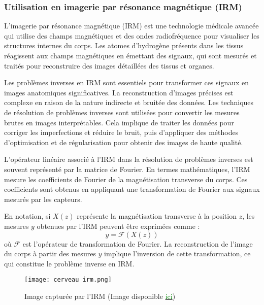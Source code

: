 \documentclass[a4paper, 12pt]{report} %
\begin{document}
\subsubsection{Utilisation en imagerie par résonance magnétique (IRM) }

L'imagerie par résonance magnétique (IRM) est une technologie médicale avancée qui utilise des champs magnétiques et des ondes radiofréquence pour visualiser les structures internes du corps. Les atomes d'hydrogène présents dans les tissus réagissent aux champs magnétiques en émettant des signaux, qui sont mesurés et traités pour reconstruire des images détaillées des tissus et organes.

Les problèmes inverses en IRM sont essentiels pour transformer ces signaux en images anatomiques significatives. La reconstruction d'images précises est complexe en raison de la nature indirecte et bruitée des données. Les techniques de résolution de problèmes inverses sont utilisées pour convertir les mesures brutes en images interprétables. Cela implique de traiter les données pour corriger les imperfections et réduire le bruit, puis d'appliquer des méthodes d'optimisation et de régularisation pour obtenir des images de haute qualité.

L'opérateur linéaire associé à l'IRM dans la résolution de problèmes inverses est souvent représenté par la matrice de Fourier. En termes mathématiques, l'IRM mesure les coefficients de Fourier de la magnétisation transverse du corps. Ces coefficients sont obtenus en appliquant une transformation de Fourier aux signaux mesurés par les capteurs.

En notation, si \( X(z) \) représente la magnétisation transverse à la position \( z \), les mesures \( y \) obtenues par l'IRM peuvent être exprimées comme :
\[
y = \mathcal{F}(X(z))
\]
où \( \mathcal{F} \) est l'opérateur de transformation de Fourier. La reconstruction de l'image du corps à partir des mesures \( y \) implique l'inversion de cette transformation, ce qui constitue le problème inverse en IRM.


\begin{figure}[H] %
    \begin{center}
    \texttt{[image: cerveau irm.png]}
    \caption{Image capturée par l'IRM (Image disponible \href{https://www.lesnumeriques.com/sante-sport/des-images-inedites-du-cerveau-humain-ont-ete-capturees-par-le-plus-puissant-irm-au-monde-n220416.html}{\textcolor{green}{ici}})}
    \label{fig:2}
    \end{center}
\end{figure}
\end{document}

